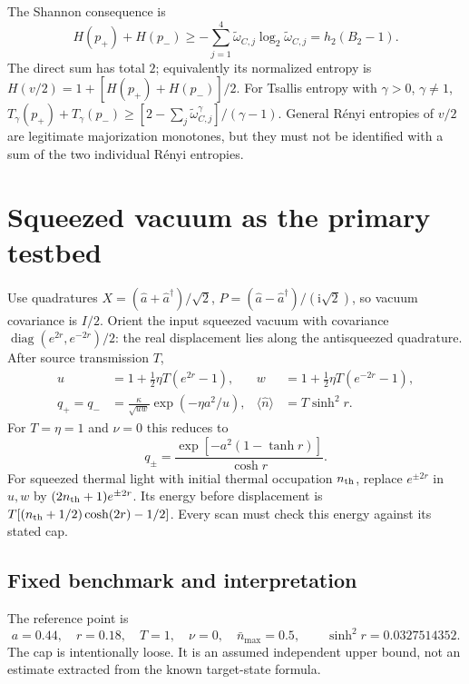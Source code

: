 \documentclass[11pt,a4paper]{article}
\newcommand{\nbar}{\bar n_{\max}}
\newcommand{\I}{I}
\begin{document}
The Shannon consequence is
\begin{equation}
 H(p_+)+H(p_-)\geq-\sum_{j=1}^4
 \widetilde\omega_{C,j}\log_2\widetilde\omega_{C,j}=h_2(B_2-1).
 \label{eq:shannon}
\end{equation}
The direct sum has total $2$; equivalently its normalized entropy is
$H(v/2)=1+[H(p_+)+H(p_-)]/2$. For Tsallis entropy with
$\gamma>0$, $\gamma\ne1$,
$T_\gamma(p_+)+T_\gamma(p_-)\geq
[2-\sum_j\widetilde\omega_{C,j}^{\gamma}]/(\gamma-1)$.
General R\'enyi entropies of $v/2$ are legitimate majorization monotones, but
they must not be identified with a sum of the two individual R\'enyi entropies.

\section{Squeezed vacuum as the primary testbed}\label{sec:squeezed}
Use quadratures $X=(\hat a+\hat a^\dagger)/\sqrt2$,
$P=(\hat a-\hat a^\dagger)/(\mathrm i\sqrt2)$, so vacuum covariance is
$\I/2$. Orient the input squeezed vacuum with covariance
$\operatorname{diag}(e^{2r},e^{-2r})/2$: the real displacement lies along
the antisqueezed quadrature. After source transmission $T$,
\begin{align}
 u&=1+\tfrac12\eta T(e^{2r}-1),&
 w&=1+\tfrac12\eta T(e^{-2r}-1),\nonumber\\
 q_+=q_-&=\frac{\kappa}{\sqrt{uw}}
                \exp(-\eta a^2/u),&
 \langle\hat n\rangle&=T\sinh^2r.\label{eq:squeezed}
\end{align}
For $T=\eta=1$ and $\nu=0$ this reduces to
\begin{equation}
 q_\pm=\frac{\exp[-a^2(1-\tanh r)]}{\cosh r}.
 \label{eq:squeezedideal}
\end{equation}
For squeezed thermal light with initial thermal occupation $n_{\rm th}$,
replace $e^{\pm2r}$ in $u,w$ by $(2n_{\rm th}+1)e^{\pm2r}$.
Its energy before displacement is
$T[(n_{\rm th}+1/2)\cosh(2r)-1/2]$. Every scan must check this energy
against its stated cap.

\subsection{Fixed benchmark and interpretation}
The reference point is
\begin{equation}
 a=0.44,\quad r=0.18,\quad T=1,\quad\nu=0,\quad\nbar=0.5,
 \qquad \sinh^2r=0.0327514352.
 \label{eq:benchmark}
\end{equation}
The cap is intentionally loose. It is an assumed independent upper bound,
not an estimate extracted from the known target-state formula.
\end{document}
